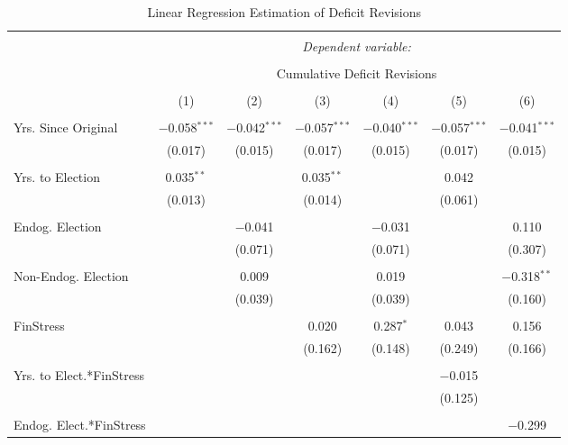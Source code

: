 
\begin{table}[!htbp] \centering 
  \caption{Linear Regression Estimation of Deficit Revisions} 
  \label{deficit_results} 
\tiny 
\begin{tabular}{@{\extracolsep{5pt}}lcccccc} 
\\[-1.8ex]\hline 
\hline \\[-1.8ex] 
 & \multicolumn{6}{c}{\textit{Dependent variable:}} \\ 
\cline{2-7} 
\\[-1.8ex] & \multicolumn{6}{c}{Cumulative Deficit Revisions} \\ 
\\[-1.8ex] & (1) & (2) & (3) & (4) & (5) & (6)\\ 
\hline \\[-1.8ex] 
 Yrs. Since Original & $-$0.058$^{***}$ & $-$0.042$^{***}$ & $-$0.057$^{***}$ & $-$0.040$^{***}$ & $-$0.057$^{***}$ & $-$0.041$^{***}$ \\ 
  & (0.017) & (0.015) & (0.017) & (0.015) & (0.017) & (0.015) \\ 
  & & & & & & \\ 
 Yrs. to Election & 0.035$^{**}$ &  & 0.035$^{**}$ &  & 0.042 &  \\ 
  & (0.013) &  & (0.014) &  & (0.061) &  \\ 
  & & & & & & \\ 
 Endog. Election &  & $-$0.041 &  & $-$0.031 &  & 0.110 \\ 
  &  & (0.071) &  & (0.071) &  & (0.307) \\ 
  & & & & & & \\ 
 Non-Endog. Election &  & 0.009 &  & 0.019 &  & $-$0.318$^{**}$ \\ 
  &  & (0.039) &  & (0.039) &  & (0.160) \\ 
  & & & & & & \\ 
 FinStress &  &  & 0.020 & 0.287$^{*}$ & 0.043 & 0.156 \\ 
  &  &  & (0.162) & (0.148) & (0.249) & (0.166) \\ 
  & & & & & & \\ 
 Yrs. to Elect.*FinStress &  &  &  &  & $-$0.015 &  \\ 
  &  &  &  &  & (0.125) &  \\ 
  & & & & & & \\ 
 Endog. Elect.*FinStress &  &  &  &  &  & $-$0.299 \\ 

\end{tabular}
\end{table}
